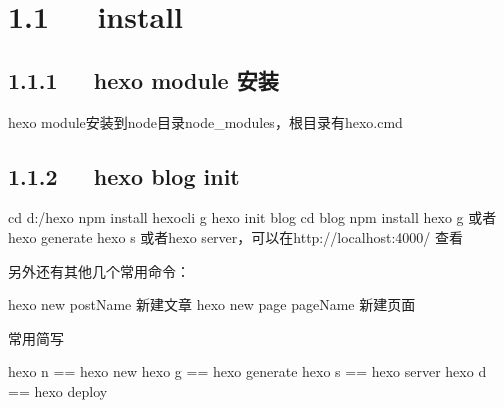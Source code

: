\documentclass[letterpaper,12pt,english]{sphinxmanual}
\begin{document}
\section{1.1   install}
\label{\detokenize{001software/001install/001._u7f51_u7ad9/hexo:install}}



\subsection{1.1.1   hexo module 安装}
\label{\detokenize{001software/001install/001._u7f51_u7ad9/hexo:hexo-module}}
\begin{sphinxVerbatim}[commandchars=\\\{\}]
   
\end{sphinxVerbatim}

hexo module安装到node目录node\_modules，根目录有hexo.cmd


\subsection{1.1.2   hexo blog init}
\label{\detokenize{001software/001install/001._u7f51_u7ad9/hexo:hexo-blog-init}}
\begin{sphinxVerbatim}[commandchars=\\\{\}]
\PYGZdl{} cd d:/hexo
\PYGZdl{} npm install hexo\PYGZhy{}cli \PYGZhy{}g
\PYGZdl{} hexo init blog
\PYGZdl{} cd blog
\PYGZdl{} npm install
\PYGZdl{} hexo g \PYGZsh{} 或者hexo generate
\PYGZdl{} hexo s \PYGZsh{} 或者hexo server，可以在http://localhost:4000/ 查看
\end{sphinxVerbatim}

另外还有其他几个常用命令：

\begin{sphinxVerbatim}[commandchars=\\\{\}]
\PYGZdl{} hexo new \PYGZdq{}postName\PYGZdq{} \PYGZsh{}新建文章
\PYGZdl{} hexo new page \PYGZdq{}pageName\PYGZdq{} \PYGZsh{}新建页面
\end{sphinxVerbatim}

常用简写

\begin{sphinxVerbatim}[commandchars=\\\{\}]
\PYGZdl{} hexo n == hexo new
\PYGZdl{} hexo g == hexo generate
\PYGZdl{} hexo s == hexo server
\PYGZdl{} hexo d == hexo deploy
\end{sphinxVerbatim}
\end{document}
